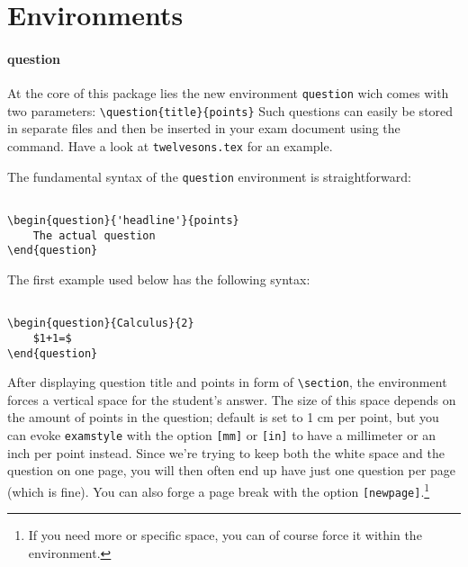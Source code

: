 \documentclass[a4paper]{scrartcl}
\begin{document}
\noindent
\section*{Environments}

\paragraph{question}
At the core of this package lies the new environment \verb|question| wich comes with two parameters: \verb+\question{title}{points}+ Such questions can easily be stored in separate files and then be inserted in your exam document using the \verb|| command. Have a look at \verb|twelvesons.tex| for an example.

The fundamental syntax of the \verb|question| environment is straightforward:

\begin{verbatim}

\begin{question}{'headline'}{points}
	The actual question
\end{question}

\end{verbatim}

\noindent
The first example used below has the following syntax:

\begin{verbatim}

\begin{question}{Calculus}{2}
	$1+1=$
\end{question}

\end{verbatim}

\noindent
After displaying question title and points in form of \verb|\section|, the environment forces a vertical space for the student's answer. The size of this space depends on the amount of points in the question; default is set to 1 cm per point, but you can evoke \verb|examstyle| with the option \verb|[mm]| or \verb|[in]| to have a millimeter or an inch per point instead. Since we're trying to keep both the white space and the question on one page, you will then often end up have just one question per page (which is fine). You can also forge a page break with the option \verb|[newpage]|.\footnote{If you need more or specific space, you can of course force it within the environment.} 
\end{document}
